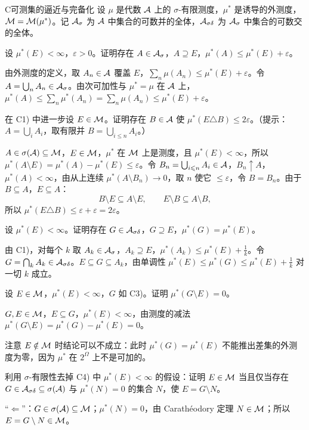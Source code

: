 \begin{probleme}{C}{可测集的逼近与完备化}
设 $\mu$ 是代数 $\mathcal{A}$ 上的 $\sigma$-有限测度，$\mu^*$ 是诱导的外测度，$\mathcal{M}=\mathcal{M}(\mu^*)$。记 $\mathcal{A}_\sigma$ 为 $\mathcal{A}$ 中集合的可数并的全体，$\mathcal{A}_{\sigma\delta}$ 为 $\mathcal{A}_\sigma$ 中集合的可数交的全体。
\begin{questions}
\item 设 $\mu^*(E)<\infty$，$\varepsilon>0$。证明存在 $A\in\mathcal{A}_\sigma$，$A\supseteq E$，$\mu^*(A)\leqslant\mu^*(E)+\varepsilon$。
\begin{solution}
由外测度的定义，取 $A_n\in\mathcal{A}$ 覆盖 $E$，$\sum_n\mu(A_n)\leqslant\mu^*(E)+\varepsilon$。令 $A=\bigcup_nA_n\in\mathcal{A}_\sigma$。由次可加性与 $\mu^*=\mu$ 在 $\mathcal{A}$ 上，$\mu^*(A)\leqslant\sum_n\mu^*(A_n)=\sum_n\mu(A_n)\leqslant\mu^*(E)+\varepsilon$。
\end{solution}
\item 在 C1) 中进一步设 $E\in\mathcal{M}$。证明存在 $B\in\mathcal{A}$ 使 $\mu^*(E\triangle B)\leqslant2\varepsilon$。（提示：$A=\bigcup_iA_i$，取有限并 $B=\bigcup_{i\leqslant n}A_i$。）
\begin{solution}
$A\in\sigma(\mathcal{A})\subseteq\mathcal{M}$，$E\in\mathcal{M}$，$\mu^*$ 在 $\mathcal{M}$ 上是测度，且 $\mu^*(E)<\infty$，所以 $\mu^*(A\setminus E)=\mu^*(A)-\mu^*(E)\leqslant\varepsilon$。令 $B_n=\bigcup_{i\leqslant n}A_i\in\mathcal{A}$，$B_n\uparrow A$，$\mu^*(A)<\infty$，由从上连续 $\mu^*(A\setminus B_n)\to0$，取 $n$ 使它 $\leqslant\varepsilon$，令 $B=B_n$。由于 $B\subseteq A$，$E\subseteq A$：
\[
B\setminus E\subseteq A\setminus E,\qquad E\setminus B\subseteq A\setminus B,
\]
所以 $\mu^*(E\triangle B)\leqslant\varepsilon+\varepsilon=2\varepsilon$。
\end{solution}
\item 设 $\mu^*(E)<\infty$。证明存在 $G\in\mathcal{A}_{\sigma\delta}$，$G\supseteq E$，$\mu^*(G)=\mu^*(E)$。
\begin{solution}
由 C1)，对每个 $k$ 取 $A_k\in\mathcal{A}_\sigma$，$A_k\supseteq E$，$\mu^*(A_k)\leqslant\mu^*(E)+\frac1k$。令 $G=\bigcap_kA_k\in\mathcal{A}_{\sigma\delta}$。$E\subseteq G\subseteq A_k$，由单调性 $\mu^*(E)\leqslant\mu^*(G)\leqslant\mu^*(E)+\frac1k$ 对一切 $k$ 成立。
\end{solution}
\item 设 $E\in\mathcal{M}$，$\mu^*(E)<\infty$，$G$ 如 C3)。证明 $\mu^*(G\setminus E)=0$。
\begin{solution}
$G,E\in\mathcal{M}$，$E\subseteq G$，$\mu^*(E)<\infty$，由测度的减法 $\mu^*(G\setminus E)=\mu^*(G)-\mu^*(E)=0$。

注意 $E\notin\mathcal{M}$ 时结论可以不成立：此时 $\mu^*(G)=\mu^*(E)$ 不能推出差集的外测度为零，因为 $\mu^*$ 在 $2^\Omega$ 上不是可加的。
\end{solution}
\item 利用 $\sigma$-有限性去掉 C4) 中 $\mu^*(E)<\infty$ 的假设：证明 $E\in\mathcal{M}$ 当且仅当存在 $G\in\mathcal{A}_{\sigma\delta}\subseteq\sigma(\mathcal{A})$ 与 $\mu^*(N)=0$ 的集合 $N$，使 $E=G\setminus N$。
\begin{solution}
“$\Leftarrow$”：$G\in\sigma(\mathcal{A})\subseteq\mathcal{M}$；$\mu^*(N)=0$，由 Carathéodory 定理 $N\in\mathcal{M}$；所以 $E=G\setminus N\in\mathcal{M}$。


\end{solution}
\end{questions}
\end{probleme}
